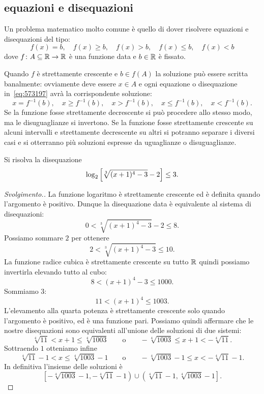\subsection{equazioni e disequazioni}

Un problema matematico molto comune è quello di dover risolvere 
equazioni e disequazioni del tipo:
\begin{equation}\label{eq:573197}
  f(x) = b, \quad f(x) \ge b, \quad f(x) > b, 
  \quad f(x) \le b, \quad f(x) < b
\end{equation}
dove $f\colon A \subseteq {\mathbb R} \to{\mathbb R}$ è una funzione data e 
$b\in {\mathbb R}$ è fissato.

Quando $f$ è strettamente crescente e $b\in f(A)$ 
la soluzione può essere 
scritta banalmente: 
ovviamente deve essere $x\in A$
e ogni equazione o disequazione in~\eqref{eq:573197}
avrà la corrispondente soluzione:
\[
  x= f^{-1}(b), \quad x \ge f^{-1}(b), \quad x>f^{-1}(b),
  \quad x \le f^{-1}(b), \quad x < f^{-1}(b).
\]
Se la funzione fosse strettamente decrescente 
si può procedere allo stesso modo, ma le disuguaglianze si invertono.
Se la funzione fosse strettamente crescente su alcuni intervalli 
e strettamente decrescente su altri si potranno separare i diversi 
casi e si otterranno più soluzioni espresse da uguaglianze
o disuguaglianze.

\begin{example}
  Si risolva la disequazione 
  \[
   \log_2{\left[ \sqrt[3]{(x+1)^4-3}-2 \right]} \le 3. 
  \]
\end{example}%
\begin{proof}[Svolgimento.]
La funzione logaritmo è strettamente crescente ed è definita 
quando l'argomento è positivo. 
Dunque la disequazione data 
è equivalente al sistema di disequazioni:
\[
0 < \sqrt[3]{(x+1)^4 - 3} - 2 \le 8.  
\]
Possiamo sommare $2$ per ottenere 
\[
  2 < \sqrt[3]{(x+1)^4 - 3} \le 10.  
\]
La funzione radice cubica è strettamente crescente 
su tutto ${\mathbb R}$ quindi possiamo invertirla elevando 
tutto al cubo:
\[
 8 < (x+1)^4 - 3 \le 1000.
\]
Sommiamo $3$:
\[
11 < (x+1)^4 \le 1003.  
\]
L'elevamento alla quarta potenza è strettamente crescente 
solo quando l'argomento è positivo, ed è una funzione pari.
Possiamo quindi affermare che le nostre disequazioni sono 
equivalenti all'unione delle soluzioni di due sistemi:
\[
  \sqrt[4]{11} < x+1 \le \sqrt[4]{1003}
  \qquad\text{o}\qquad 
  -\sqrt[4]{1003} \le x+1 < -\sqrt[4]{11}.
\]
Sottraendo $1$ otteniamo infine 
\[
  \sqrt[4]{11} -1 < x \le \sqrt[4]{1003} - 1
  \qquad\text{o}\qquad 
  -\sqrt[4]{1003} -1 \le x < -\sqrt[4]{11} -1.
\]
In definitiva l'insieme delle soluzioni è 
\[
\left[-\sqrt[4]{1003} - 1, -\sqrt[4]{11}-1\right)
\cup \left(\sqrt[4]{11}-1 , \sqrt[4]{1003} -1\right].  
\]
\end{proof}

